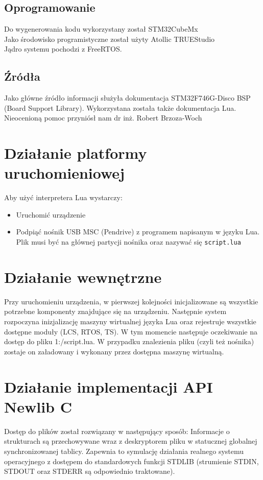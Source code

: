 \documentclass{article}
\begin{document}
\subsection{Oprogramowanie}

Do wygenerowania kodu wykorzystany został STM32CubeMx\\ 
Jako środowisko programistyczne został użyty Atollic TRUEStudio\\             
Jądro systemu pochodzi z FreeRTOS.

\subsection{Źródła}

Jako główne źródło informacji służyła dokumentacja STM32F746G-Disco BSP (Board Support Library). Wykorzystana została także dokumentacja 
Lua.\\
Nieocenioną pomoc przyniósł nam dr inż. Robert Brzoza-Woch

\newpage


\section{Działanie platformy uruchomieniowej}
Aby użyć interpretera Lua wystarczy:
\begin{itemize}
  \item Uruchomić urządzenie
  \item Podpiąć nośnik USB MSC (Pendrive) z programem napisanym w języku Lua. Plik musi być na głównej partycji nośnika oraz nazywać się \texttt{script.lua}
\end{itemize}

\section{Działanie wewnętrzne}
Przy uruchomieniu urządzenia, w pierwszej kolejności inicjalizowane są wszystkie potrzebne komponenty znajdujące się na urządzeniu.
Następnie system rozpoczyna inizjalizację maszyny wirtualnej języka Lua oraz rejestruje wszystkie dostępne moduły (LCS, RTOS, TS). 
W tym momencie następuje oczekiwanie na dostęp do pliku 1:/script.lua. W przypadku znalezienia pliku (czyli też nośnika) zostaje on 
załadowany i wykonany przez dostępna maszynę wirtualną.

\section{Działanie implementacji API Newlib C}
Dostęp do plików został rozwiązany w następujący sposób: Informacje o strukturach są przechowywane wraz z deskryptorem pliku w statucznej 
globalnej synchronizowanej tablicy. Zapewnia to symulację działania realnego systemu operacyjnego z dostępem do standardowych funkcji STDLIB 
(strumienie STDIN, STDOUT oraz STDERR są odpowiednio traktowane).
\end{document}
